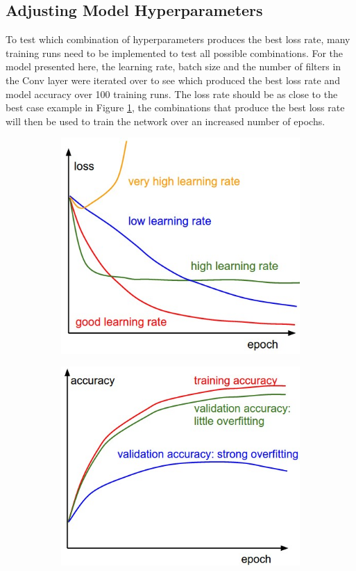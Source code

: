 \subsection{Adjusting Model Hyperparameters}
To test which combination of hyperparameters produces the best loss rate, many training runs need to be implemented to test all possible combinations. For the model presented here, the learning rate, batch size and the number of filters in the Conv layer were iterated over to see which produced the best loss rate and model accuracy over 100 training runs. The loss rate should be as close to the best case example in Figure \ref{fig.lr}, the combinations that produce the best loss rate will then be used to train the network over an increased number of epochs.
\begin{figure}[htpb]
\centering
\begin{subfigure}{0.45\textwidth}
\includegraphics[width=\textwidth]{Part1/chapter2/chapter/figs/learningrates.jpeg}
\caption{}
\label{fig.lr}
\end{subfigure}%
\qquad
\begin{subfigure}{0.45\textwidth}
\includegraphics[width=\textwidth]{Part1/chapter2/chapter/figs/accuracies.jpeg}

\end{subfigure}
\end{figure}

